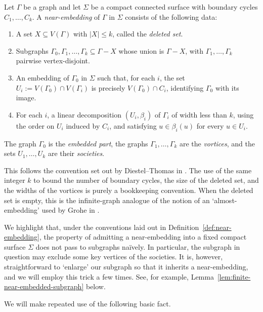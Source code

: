 \documentclass[a4paper]{amsart}
\begin{document}
\begin{definition}\label{def:near-embedding}
Let $\Gamma$ be a graph and let $\Sigma$ be a compact connected surface with boundary cycles $C_1,\ldots,C_k$.
A \emph{near-embedding} of $\Gamma$ in $\Sigma$ consists of the following data:
\begin{enumerate}
\item A set $X\subseteq V(\Gamma)$ with $|X|\leq k$, called the \emph{deleted set}.
\item Subgraphs $\Gamma_0,\Gamma_1,\ldots,\Gamma_k\subseteq\Gamma-X$ whose union is $\Gamma-X$, with $\Gamma_1,\ldots,\Gamma_k$ pairwise vertex-disjoint.
\item An embedding of $\Gamma_0$ in $\Sigma$ such that, for each $i$, the set $U_i:=V(\Gamma_0)\cap V(\Gamma_i)$ is precisely $V(\Gamma_0)\cap C_i$, identifying $\Gamma_0$ with its image.
\item For each $i$, a linear decomposition $(U_i,\beta_i)$ of $\Gamma_i$ of width less than $k$, using the order on $U_i$ induced by $C_i$, and satisfying $u\in\beta_i(u)$ for every $u\in U_i$.
\end{enumerate}
The graph $\Gamma_0$ is the \emph{embedded part}, the graphs $\Gamma_1,\ldots,\Gamma_k$ are the \emph{vortices}, and the sets $U_1,\ldots,U_k$ are their \emph{societies}.
\end{definition}

This follows the convention set out by Diestel--Thomas in \cite{diestel1999excluding}. 
The use of the same integer $k$ to bound the number of boundary cycles, the size of the deleted set, and the widths of the vortices is purely a bookkeeping convention.
When the deleted set is empty, this is the infinite-graph analogue of the notion of an `almost-embedding' used by Grohe in  \cite{Grohe03}.


\begin{remark}
    We highlight that, under the conventions laid out in Definition~\ref{def:near-embedding}, the property of admitting a near-embedding into a fixed compact surface $\Sigma$ does not pass to subgraphs na\"ively. In particular, the subgraph in question may exclude some key vertices of the societies. It is, however, straightforward to `enlarge' our subgraph so that it inherits a near-embedding, and we will employ this trick a few times. See, for example,  Lemma~\ref{lem:finite-near-embedded-subgraph} below.
\end{remark}

We will make repeated use of the following basic fact. 
\end{document}
